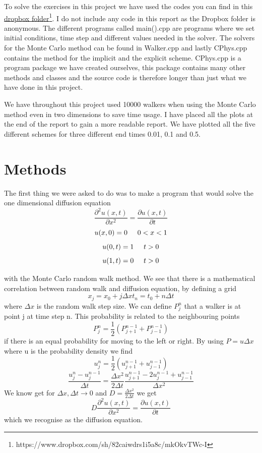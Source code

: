 \documentclass[a4wide,12pt]{article}
\begin{document}
To solve the exercises in this project we have used the codes you can find in this 
\href{https://www.dropbox.com/sh/82caiwdrs1i5a8c/mkOkvTWc-I}{dropbox folder}\footnote{https://www.dropbox.com/sh/82caiwdrs1i5a8c/mkOkvTWc-I}. I do not include any code in this report as the Dropbox folder is anonymous.  
The different programs called main().cpp are programs where we set initial conditions, time step and different values needed in the solver. The solvers for the Monte Carlo method
can be found in Walker.cpp and lastly CPhys.cpp contains the method for the implicit and the explicit scheme. 
CPhys.cpp is a program package we have created ourselves, this package contains many other methods and classes and the source code is therefore longer than just what we have done in this project. 

We have throughout this project used 10000 walkers when using the Monte Carlo method even in two dimensions to save time usage.  
I have placed all the plots at the end of the report to gain a more readable report. 
We have plotted all the five different schemes for three different end times 0.01, 0.1 and 0.5. 
\section*{Methods}
The first thing we were asked to do was to make a program that would solve the one dimensional diffusion equation 
\[
\frac{\partial^{2}u(x,t)}{\partial x^{2}} = \frac{\partial{u(x,t)}}{\partial t}
\]
\[
u(x,0)= 0 \hspace{0.5cm} 0 < x < 1
\]
\[
u(0,t)= 1 \hspace{0.5cm} t > 0
\]
\[
u(1,t)= 0 \hspace{0.5cm} t > 0
\]

with the Monte Carlo random walk method. We see that there is a mathematical correlation between random walk and diffusion equation,
by defining a grid
\[
x_{j} = x_{0} + j \Delta x
t_{n} = t_{0} + n \Delta t
\]
where $\Delta x$ is the random walk step size. We can define $P^{n}_{j}$ that a walker is at point j at time step n.
This probability is related to the neighbouring points
\[
P^{n}_{j} = \frac{1}{2}(P^{n-1}_{j+1}+P^{n-1}_{j-1})
\]
if there is an equal probability for moving to the left or right. By using $P = u\Delta x$ where u is the probability density
we find
\[
u^{n}_{j} = \frac{1}{2}(u^{n-1}_{j+1}+u^{n-1}_{j-1})
\]
\[
\frac{u^{n}_{j} - u^{n-1}_{j}}{\Delta t} = \frac{\Delta x^{2}}{2\Delta t}\frac{u^{n-1}_{j+1}-2 u^{n-1}_ {j}+u^{n-1}_{j-1}}{\Delta x^{2}}
\]
We know get for $\Delta x, \Delta t \rightarrow 0$ and $D = \frac{\Delta x^{2}}{2\Delta t}$ we get
\[
 D\frac{\partial^{2}u(x,t)}{\partial x^{2}} = \frac{\partial u(x,t)}{\partial t}
\]
which we recognise as the diffusion equation.
\end{document}
